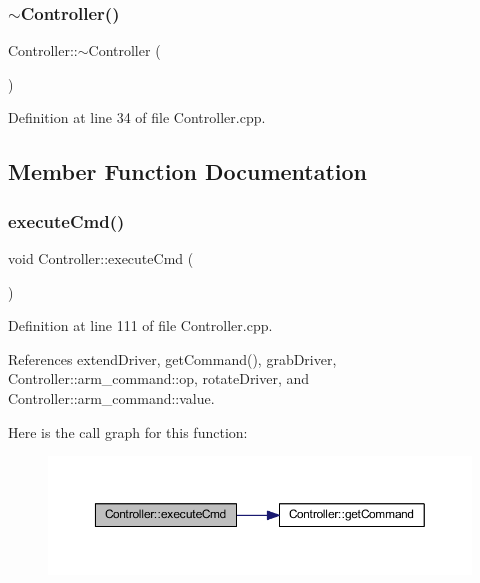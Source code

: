 \subsubsection{\texorpdfstring{$\sim$\+Controller()}{~Controller()}}
{\footnotesize\ttfamily Controller\+::$\sim$\+Controller (\begin{DoxyParamCaption}{ }\end{DoxyParamCaption})\hspace{0.3cm}{\ttfamily [virtual]}}



Definition at line 34 of file Controller.\+cpp.



\subsection{Member Function Documentation}
\mbox{\label{class_controller_a70a36b927bb2df8febae95ed3cb50d63}} 
\subsubsection{\texorpdfstring{execute\+Cmd()}{executeCmd()}}
{\footnotesize\ttfamily void Controller\+::execute\+Cmd (\begin{DoxyParamCaption}{ }\end{DoxyParamCaption})}



Definition at line 111 of file Controller.\+cpp.



References extend\+Driver, get\+Command(), grab\+Driver, Controller\+::arm\+\_\+command\+::op, rotate\+Driver, and Controller\+::arm\+\_\+command\+::value.

Here is the call graph for this function\+:\nopagebreak
\begin{figure}[H]
\begin{center}
\leavevmode
\includegraphics[width=350pt]{class_controller_a70a36b927bb2df8febae95ed3cb50d63_cgraph}
\end{center}
\end{figure}
\mbox{\label{class_controller_aaf8bd1fc8842fa7a5544af219adf414c}} 
